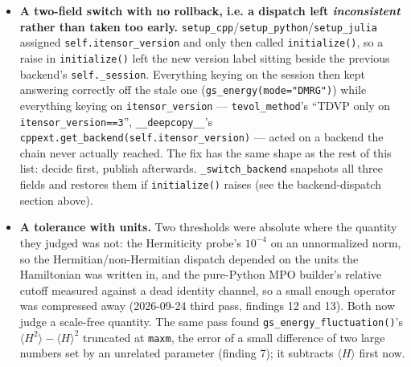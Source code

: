 \documentclass[11pt]{article}
\begin{document}
\begin{itemize}
    dynamical correlators'' section above records the resolution, and
    every submode implementation points at it. The same shape turned up
    twice more on 2026-09-22, which is why it is worth recognizing
    rather than remembering: \texttt{submode="TD"}/\texttt{"TDZ"}
    returned the one-sided transform their own algebra produced rather
    than the density, and \texttt{delta} meant three different widths
    under \texttt{submode="KPM"} depending on which route answered. Both
    were resolved the same way as this one, by a normative statement
    plus a single shared implementation
    (\texttt{timedependent.lehmann\_density\_from\_one\_sided},
    \texttt{algebra/kpm.py::polynomials\_for\_broadening}) rather than
    by correcting each route in place.
  \item \textbf{A two-field switch with no rollback, i.e. a dispatch left
    \emph{inconsistent} rather than taken too early.}
    \texttt{setup\_cpp}/\texttt{setup\_python}/\texttt{setup\_julia}
    assigned \texttt{self.itensor\_version} and only then called
    \texttt{initialize()}, so a raise in \texttt{initialize()} left the
    new version label sitting beside the previous backend's
    \texttt{self.\_session}. Everything keying on the session then kept
    answering correctly off the stale one
    (\texttt{gs\_energy(mode="DMRG")}) while everything keying on
    \texttt{itensor\_version} --- \texttt{tevol\_method}'s ``TDVP only on
    \texttt{itensor\_version==3}'', \texttt{\_\_deepcopy\_\_}'s
    \texttt{cppext.get\_backend(self.itensor\_version)} --- acted on a
    backend the chain never actually reached. The fix has the same shape
    as the rest of this list: decide first, publish afterwards.
    \texttt{\_switch\_backend} snapshots all three fields and restores
    them if \texttt{initialize()} raises (see the backend-dispatch
    section above).
  \item \textbf{A tolerance with units.} Two thresholds were absolute
    where the quantity they judged was not: the Hermiticity probe's
    $10^{-4}$ on an unnormalized norm, so the Hermitian/non-Hermitian
    dispatch depended on the units the Hamiltonian was written in, and
    the pure-Python MPO builder's relative cutoff measured against a dead
    identity channel, so a small enough operator was compressed away
    (2026-09-24 third pass, findings 12 and 13). Both now judge a
    scale-free quantity. The same pass found
    \texttt{gs\_energy\_fluctuation()}'s
    $\langle H^2\rangle-\langle H\rangle^2$ truncated at \texttt{maxm},
    the error of a small difference of two large numbers set by an
    unrelated parameter (finding 7); it subtracts $\langle H\rangle$
    first now.
\end{itemize}
\end{document}
